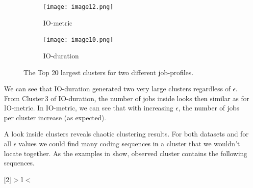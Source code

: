 \documentclass{jhps}
\begin{document}
\begin{figure}
 \begin{subfigure}[t]{0.45\textwidth}
	\texttt{[image: image12.png]}
	\caption{IO-metric}
	\label{fig:datasets_clustering_results:io_metric}
 \end{subfigure}
 \hfill
	\begin{subfigure}[t]{0.45\textwidth}
	\texttt{[image: image10.png]}
	\caption{IO-duration}
	\label{fig:datasets_clustering_results:io_duration}
 \end{subfigure}

 \caption{The Top 20 largest clusters for two different job-profiles.}
 \label{fig:datasets_clustering_results}
\end{figure}

We can see that IO-duration generated two very large clusters regardless of $\epsilon$.
From Cluster\,3 of IO-duration, the number of jobs inside looks then similar as for IO-metric.
In IO-metric, we can see that with increasing $\epsilon$, the number of jobs per cluster increase (as expected).

A look inside clusters reveals chaotic clustering results.
For both datasets and for all $\epsilon$ values we could find many coding sequences in a cluster that we wouldn't locate together.
As the examples in  show, observed cluster contains the following sequences.

\def\rd{3}
\newcolumntype{R}[2]{%
    >{\bgroup}%
    l%
    <{\egroup}%
}
\newcommand*\rot{\multicolumn{1}{R{45}{1em}}}%
\end{document}
